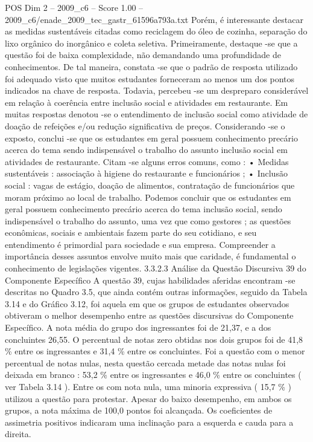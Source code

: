 \begin{textsample}{POS Dim 2 – 2009\_c6 – Score 1.00 – 2009\_c6/enade\_2009\_tec\_gastr\_61596a793a.txt}
Porém, é interessante destacar as medidas sustentáveis citadas como reciclagem do óleo de cozinha, separação do lixo orgânico do inorgânico e coleta seletiva.
Primeiramente, destaque -se que a questão foi de baixa complexidade, não demandando uma profundidade de conhecimentos.
De tal maneira, constata -se que o padrão de resposta utilizado foi adequado visto que muitos estudantes forneceram ao menos um dos pontos indicados na chave de resposta.
Todavia, percebeu -se um despreparo considerável em relação à coerência entre inclusão social e atividades em restaurante.
Em muitas respostas denotou -se o entendimento de inclusão social como atividade de doação de refeições e/ou redução significativa de preços.
Considerando -se o exposto, conclui -se que os estudantes em geral possuem conhecimento precário acerca do tema sendo indispensável o trabalho do assunto inclusão social em atividades de restaurante.
Citam -se alguns erros comuns, como : • Medidas sustentáveis : associação à higiene do restaurante e funcionários ; • Inclusão social : vagas de estágio, doação de alimentos, contratação de funcionários que moram próximo ao local de trabalho.
Podemos concluir que os estudantes em geral possuem conhecimento precário acerca do tema inclusão social, sendo indispensável o trabalho do assunto, uma vez que como gestores ; as questões econômicas, sociais e ambientais fazem parte do seu cotidiano, e seu entendimento é primordial para sociedade e sua empresa.
Compreender a importância desses assuntos envolve muito mais que caridade, é fundamental o conhecimento de legislações vigentes. 3.3.2.3 Análise da Questão Discursiva 39 do Componente Específico A questão 39, cujas habilidades aferidas encontram -se descritas no Quadro 3.5, que ainda contém outras informações, seguido da Tabela 3.14 e do Gráfico 3.12, foi aquela em que os grupos de estudantes observados obtiveram o melhor desempenho entre as questões discursivas do Componente Específico.
A nota média do grupo dos ingressantes foi de 21,37, e a dos concluintes 26,55.
O percentual de notas zero obtidas nos dois grupos foi de 41,8 \% entre os ingressantes e 31,4 \% entre os concluintes.
Foi a questão com o menor percentual de notas nulas, nesta questão cercada metade das notas nulas foi deixada em branco : 53,2 \% entre os ingressantes e 46,0 \% entre os concluintes ( ver Tabela 3.14 ).
Entre os com nota nula, uma minoria expressiva ( 15,7 \% ) utilizou a questão para protestar.
Apesar do baixo desempenho, em ambos os grupos, a nota máxima de 100,0 pontos foi alcançada.
Os coeficientes de assimetria positivos indicaram uma inclinação para a esquerda e cauda para a direita.

\end{textsample}
